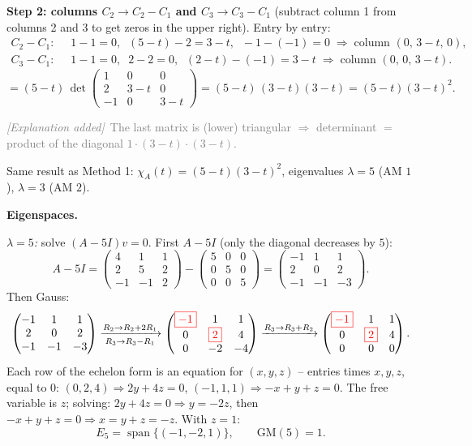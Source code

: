 \documentclass[a4paper,12pt]{article}
\newcommand{\piv}[1]{{\color{red}\boxed{#1}}}
\newcommand{\erglerk}{\textcolor{gray}{\small\textit{[Explanation added]}}}
\begin{document}
\textbf{Step 2: columns $C_2 \to C_2 - C_1$ and $C_3 \to C_3 - C_1$} (subtract column 1 from columns 2 and 3 to get zeros in the upper right). Entry by entry:
\begin{align*}
C_2 - C_1:\;\; & 1-1 = 0,\;\; (5-t)-2 = 3-t,\;\; -1-(-1) = 0 \;\Rightarrow\; \text{column } (0,\, 3-t,\, 0), \\
C_3 - C_1:\;\; & 1-1 = 0,\;\; 2-2 = 0,\;\; (2-t)-(-1) = 3-t \;\Rightarrow\; \text{column } (0,\, 0,\, 3-t).
\end{align*}
\[
= (5-t)\,\det\!\begin{pmatrix} 1 & 0 & 0 \\ 2 & 3-t & 0 \\ -1 & 0 & 3-t \end{pmatrix}
= (5-t)\,(3-t)(3-t) = (5-t)(3-t)^2.
\]

\erglerk\ \textcolor{gray}{\small The last matrix is (lower) triangular $\Rightarrow$ determinant $=$ product of the diagonal $1\cdot(3-t)\cdot(3-t)$.}

Same result as Method 1: $\chi_A(t) = (5-t)(3-t)^2$, eigenvalues $\lambda = 5$ (AM $1$), $\lambda = 3$ (AM $2$).

\medskip
\textbf{Eigenspaces.}

\textit{$\lambda = 5$:} solve $(A - 5I)v = 0$. First $A - 5I$ (only the diagonal decreases by $5$):
\[
A - 5I = \begin{pmatrix} 4 & 1 & 1 \\ 2 & 5 & 2 \\ -1 & -1 & 2 \end{pmatrix} - \begin{pmatrix} 5 & 0 & 0 \\ 0 & 5 & 0 \\ 0 & 0 & 5 \end{pmatrix} = \begin{pmatrix} -1 & 1 & 1 \\ 2 & 0 & 2 \\ -1 & -1 & -3 \end{pmatrix}.
\]
Then Gauss:
\[
\begin{pmatrix} -1 & 1 & 1 \\ 2 & 0 & 2 \\ -1 & -1 & -3 \end{pmatrix}
\xrightarrow[R_3 \to R_3 - R_1]{R_2 \to R_2 + 2R_1}
\begin{pmatrix} \piv{-1} & 1 & 1 \\ 0 & \piv{2} & 4 \\ 0 & -2 & -4 \end{pmatrix}
\xrightarrow{R_3 \to R_3 + R_2}
\begin{pmatrix} \piv{-1} & 1 & 1 \\ 0 & \piv{2} & 4 \\ 0 & 0 & 0 \end{pmatrix}.
\]
Each row of the echelon form is an equation for $(x,y,z)$ -- entries times $x, y, z$, equal to $0$: \; $(0,2,4) \Rightarrow 2y + 4z = 0$, \quad $(-1,1,1) \Rightarrow -x + y + z = 0$. The free variable is $z$; solving: $2y + 4z = 0 \Rightarrow y = -2z$, then $-x + y + z = 0 \Rightarrow x = y + z = -z$. With $z = 1$:
\[
E_5 = \operatorname{span}\{(-1, -2, 1)\}, \qquad \text{GM}(5) = 1.
\]
\end{document}
